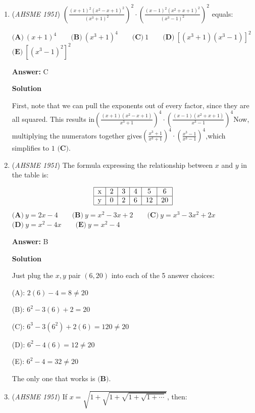\begin{enumerate}
 


	\item (\textit{AHSME 1951}) $\left(\frac{(x+1)^{2}(x^{2}-x+1)^{2}}{(x^{3}+1)^{2}}\right)^{2}\cdot\left(\frac{(x-1)^{2}(x^{2}+x+1)^{2}}{(x^{3}-1)^{2}}\right)^{2}$ equals:


 $\textbf{(A)}\ (x+1)^{4}\qquad\textbf{(B)}\ (x^{3}+1)^{4}\qquad\textbf{(C)}\ 1\qquad\textbf{(D)}\ [(x^{3}+1)(x^{3}-1)]^{2}$
$\textbf{(E)}\ [(x^{3}-1)^{2}]^{2}$

 \textbf{Answer: }C



\textbf{Solution}

First, note that we can pull the exponents out of every factor, since they are all squared. This results in$\left(\frac{(x+1)(x^{2}-x+1)}{x^{3}+1}\right)^{4}\cdot\left(\frac{(x-1)(x^{2}+x+1)}{x^{3}-1}\right)^{4}$Now, multiplying the numerators together gives$\left(\frac{x^3+1}{x^3+1}\right)^{4}\cdot\left(\frac{x^3-1}{x^3-1}\right)^{4}$,which simplifies to $\boxed{1\textbf{ (C)}}$.

 


	\item (\textit{AHSME 1951}) The formula expressing the relationship between $x$ and $y$ in the table is:

 \[\begin{tabular}{|c|c|c|c|c|c|}\hline x & 2 & 3 & 4 & 5 & 6\\ \hline y & 0 & 2 & 6 & 12 & 20\\ \hline\end{tabular}\]
$\textbf{(A)}\ y = 2x-4\qquad\textbf{(B)}\ y = x^{2}-3x+2\qquad\textbf{(C)}\ y = x^{3}-3x^{2}+2x$
$\textbf{(D)}\ y = x^{2}-4x\qquad\textbf{(E)}\ y = x^{2}-4$

 \textbf{Answer: }B



\textbf{Solution}

Just plug the $x,y$ pair $(6,20)$ into each of the 5 answer choices:

 (A): $2(6)-4=8\ne20$

 (B): $6^2-3(6)+2=20$

 (C): $6^3-3(6^2)+2(6)=120\ne20$

 (D): $6^2-4(6)=12\ne20$

 (E): $6^2-4=32\ne20$

 The only one that works is $\boxed{\textbf{(B)}}$.

 


	\item (\textit{AHSME 1951}) If $x =\sqrt{1+\sqrt{1+\sqrt{1+\sqrt{1+\cdots}}}}$, then:



\end{enumerate}
